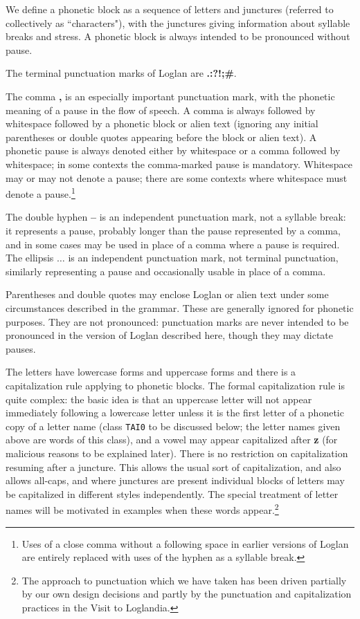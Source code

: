 \documentclass[12pt]{book}
\begin{document}
We define a phonetic block as a sequence of  letters and junctures (referred to collectively as ``characters"), with the junctures giving information about syllable breaks and stress.  A phonetic block is always intended to be pronounced without pause.

The terminal punctuation marks of Loglan are {\bf .:?!;\#}.  

The comma {\bf ,} is an especially important punctuation mark, with the phonetic meaning of a pause in the flow of speech.  A comma is always followed by whitespace followed by a phonetic block or alien text (ignoring any initial parentheses or double quotes appearing before the block or alien text).
A phonetic pause is always denoted either by whitespace or a comma followed by whitespace;  in some contexts the comma-marked pause is mandatory.  Whitespace may or may not denote a pause;  there are some contexts where whitespace must denote a pause.\footnote{Uses of a close comma without a following space in earlier versions of Loglan are entirely replaced with uses of the hyphen as a syllable break.}

The double hyphen {\bf --} is an independent punctuation mark, not a syllable break:  it represents a pause, probably longer than the pause represented by a comma, and in some cases may be used in place of a comma where a pause is required.  The ellipsis $\ldots$ is an independent punctuation mark, not terminal punctuation, similarly representing a pause and occasionally usable in place of a comma.

Parentheses and double quotes may enclose Loglan or alien text  under some circumstances described in the grammar.  These are generally ignored for phonetic purposes.  They are not pronounced:  punctuation marks are never intended to be pronounced in the version of Loglan described here, though they may dictate pauses.

The letters have lowercase forms and uppercase forms and there is a capitalization rule applying to phonetic blocks.  The formal capitalization rule is quite complex:  the basic idea is that an uppercase letter will not appear immediately following a lowercase letter unless it is the first letter of a phonetic copy of a letter name (class {\tt TAI0} to be discussed below; the letter names given above are words of this class), and a vowel may appear capitalized after {\bf z} (for malicious reasons to be explained later).    There is no restriction on capitalization resuming after a juncture.  This allows the usual sort of capitalization, and also allows all-caps, and where junctures are present individual blocks of letters may be capitalized in different styles independently.
The special treatment of letter names will be motivated in examples when these words appear.\footnote{The approach to punctuation which we have taken has been driven partially by our own design decisions and partly by the punctuation and capitalization practices in the Visit to Loglandia.}
\end{document}
